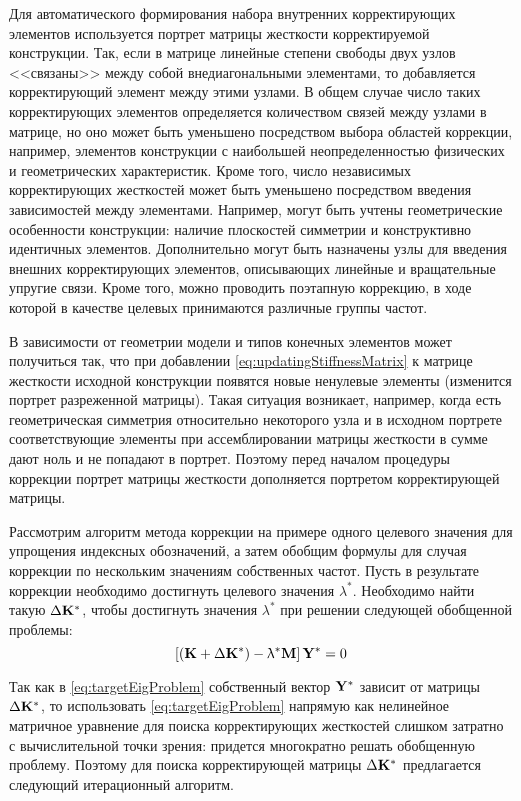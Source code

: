 Для автоматического формирования набора внутренних корректирующих элементов используется портрет матрицы жесткости корректируемой конструкции. Так, если в матрице линейные степени свободы двух узлов <<связаны>> между собой внедиагональными элементами, то добавляется корректирующий элемент между этими узлами. В общем случае число таких корректирующих элементов определяется количеством связей между узлами в матрице, но оно может быть уменьшено посредством выбора областей коррекции, например, элементов конструкции с наибольшей неопределенностью физических и геометрических характеристик. Кроме того, число независимых корректирующих жесткостей может быть уменьшено посредством введения зависимостей между элементами. Например, могут быть учтены геометрические особенности конструкции: наличие плоскостей симметрии и конструктивно идентичных элементов. Дополнительно могут быть назначены узлы для введения внешних корректирующих элементов, описывающих линейные и вращательные упругие связи. Кроме того, можно проводить поэтапную коррекцию, в ходе которой в качестве целевых принимаются различные группы частот.

В зависимости от геометрии модели и типов конечных элементов может получиться так, что при добавлении \eqref{eq:updatingStiffnessMatrix} к матрице жесткости исходной конструкции появятся новые ненулевые элементы (изменится портрет разреженной матрицы). Такая ситуация возникает, например, когда есть геометрическая симметрия относительно некоторого узла и в исходном портрете соответствующие элементы при ассемблировании матрицы жесткости в сумме дают ноль и не попадают в портрет. Поэтому перед началом процедуры коррекции портрет матрицы жесткости дополняется портретом корректирующей матрицы.

Рассмотрим алгоритм метода коррекции на примере одного целевого значения для упрощения индексных обозначений, а затем обобщим формулы для случая коррекции по нескольким значениям собственных частот. Пусть в результате коррекции необходимо достигнуть целевого значения $ \lambda ^ \ast $. Необходимо найти такую $ \Delta \mathbf{K} ^ \ast $, чтобы достигнуть значения $ \lambda ^ \ast $ при решении следующей обобщенной проблемы:
\begin{equation}
	\left[ \left( \mathbf{K} + \Delta \mathbf{K} ^ \ast \right) - \uplambda ^ \ast \mathbf{M} \right] \mathbf{Y} ^ \ast = 0
	\label{eq:targetEigProblem}
\end{equation}

Так как в \eqref{eq:targetEigProblem} собственный вектор $ \mathbf{Y} ^ \ast $ зависит от матрицы $ \Delta \mathbf{K} ^ \ast $, то использовать \eqref{eq:targetEigProblem} напрямую как нелинейное матричное уравнение для поиска корректирующих жесткостей слишком затратно с вычислительной точки зрения: придется многократно решать обобщенную проблему. Поэтому для поиска корректирующей матрицы $ \Delta \mathbf{K} ^ \ast $ предлагается следующий итерационный алгоритм.

